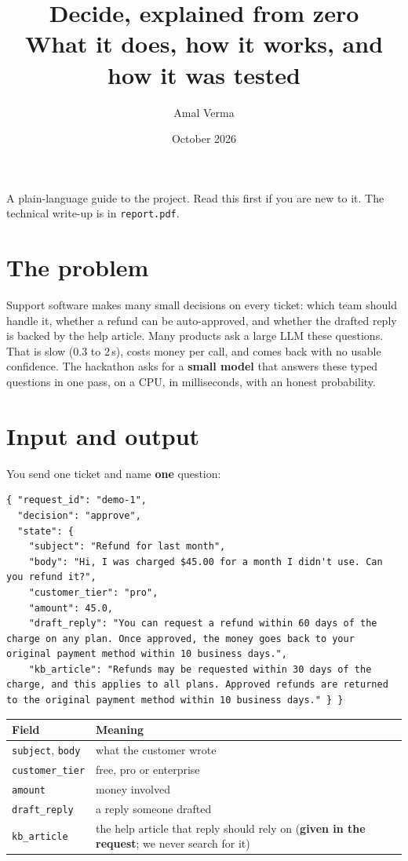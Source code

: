 \documentclass[11pt,a4paper]{article}
\title{\textbf{Decide, explained from zero}\\[2pt]\large What it does, how it works, and how it was tested}
\author{Amal Verma}
\date{October 2026}
\begin{document}
\maketitle
\noindent A plain-language guide to the project. Read this first if you are new to it.
The technical write-up is in \texttt{report.pdf}.

\section{The problem}
Support software makes many small decisions on every ticket: which team should handle
it, whether a refund can be auto-approved, and whether the drafted reply is backed by
the help article. Many products ask a large LLM these questions. That is slow (0.3 to
2\,s), costs money per call, and comes back with no usable confidence. The hackathon
asks for a \textbf{small model} that answers these typed questions in one pass, on a
CPU, in milliseconds, with an honest probability.

\section{Input and output}
You send one ticket and name \textbf{one} question:
\begin{lstlisting}
{ "request_id": "demo-1",
  "decision": "approve",
  "state": {
    "subject": "Refund for last month",
    "body": "Hi, I was charged $45.00 for a month I didn't use. Can you refund it?",
    "customer_tier": "pro",
    "amount": 45.0,
    "draft_reply": "You can request a refund within 60 days of the charge on any plan. Once approved, the money goes back to your original payment method within 10 business days.",
    "kb_article": "Refunds may be requested within 30 days of the charge, and this applies to all plans. Approved refunds are returned to the original payment method within 10 business days." } }
\end{lstlisting}

\noindent\begin{tabularx}{\linewidth}{@{}lL@{}}
\toprule
Field & Meaning \\
\midrule
\texttt{subject}, \texttt{body} & what the customer wrote \\
\texttt{customer\_tier} & free, pro or enterprise \\
\texttt{amount} & money involved \\
\texttt{draft\_reply} & a reply someone drafted \\
\texttt{kb\_article} & the help article that reply should rely on (\textbf{given in the request}; we never search for it) \\
\bottomrule
\end{tabularx}
\end{document}
